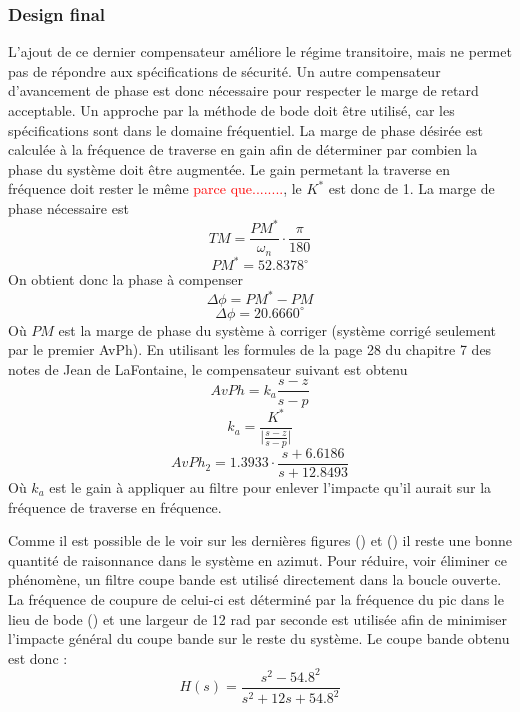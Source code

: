 \documentclass{udes_rapport} %
\begin{document}
\subsubsection{Design final}

L'ajout de ce dernier compensateur améliore le régime transitoire, mais ne permet pas de répondre aux spécifications de sécurité. Un autre compensateur d'avancement de phase est donc nécessaire pour respecter le marge de retard acceptable. Un approche par la méthode de bode doit être utilisé, car les spécifications sont dans le domaine fréquentiel. La marge de phase désirée est calculée à la fréquence de traverse en gain afin de déterminer par combien la phase du système doit être augmentée. Le gain permetant la traverse en fréquence doit rester le même \textcolor{red}{parce que........}, le $K^*$ est donc de 1.
La marge de phase nécessaire est 
\[ TM = \frac{PM^*}{\omega_n}\cdot\frac{\pi}{180}\]
\[PM^* = 52.8378^\circ\]
On obtient donc la phase à compenser
\[\Delta \phi = PM^* - PM \]
\[\Delta \phi = 20.6660^\circ\]
Où $PM$ est la marge de phase du système à corriger (système corrigé seulement par le premier AvPh). En utilisant les formules de la page 28 du chapitre 7 des notes de Jean de LaFontaine, le compensateur suivant est obtenu
\[AvPh = k_a\frac{s-z}{s-p}\]
\[k_a = \frac{K^*}{\vert \frac{s-z}{s-p} \vert}\]
\[ AvPh_2 =  1.3933 \cdot \frac{s+6.6186}{s+12.8493}\]
Où $k_a$ est le gain à appliquer au filtre pour enlever l'impacte qu'il aurait sur la fréquence de traverse en fréquence.

Comme il est possible de le voir sur les dernières figures () et () il reste une bonne quantité de raisonnance dans le système en azimut. Pour réduire, voir éliminer ce phénomène, un filtre coupe bande est utilisé directement dans la boucle ouverte. La fréquence de coupure de celui-ci est déterminé par la fréquence du pic dans le lieu de bode () et une largeur de 12 rad par seconde est utilisée afin de minimiser l'impacte général du coupe bande sur le reste du système. Le coupe bande obtenu est donc :
\[H(s) = \frac{s^2 - 54.8^2}{s^2 + 12s + 54.8^2}\]
\end{document}
